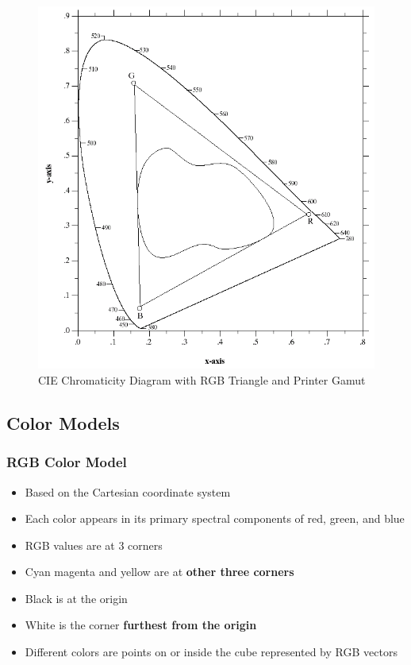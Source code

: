 \begin{figure}
  \centering
  \includegraphics[width=0.8\linewidth]{images/cie_triangle.png}
  \caption{CIE Chromaticity Diagram with RGB Triangle and Printer Gamut}
\end{figure}

\subsection*{Color Models}

\subsubsection*{RGB Color Model}

\begin{itemize}
  \item Based on the Cartesian coordinate system
  \item Each color appears in its primary spectral components of
    \textcolor{MaterialRed900}{red},
    \textcolor{MaterialGreen900}{green}, and \textcolor{MaterialBlue900}{blue}

  \item RGB values are at 3 corners
  \item Cyan magenta and yellow are at \textbf{other three corners}
  \item Black is at the origin
  \item White is the corner \textbf{furthest from the origin}
  \item Different colors are points on or inside the cube represented
    by RGB vectors
\end{itemize}

